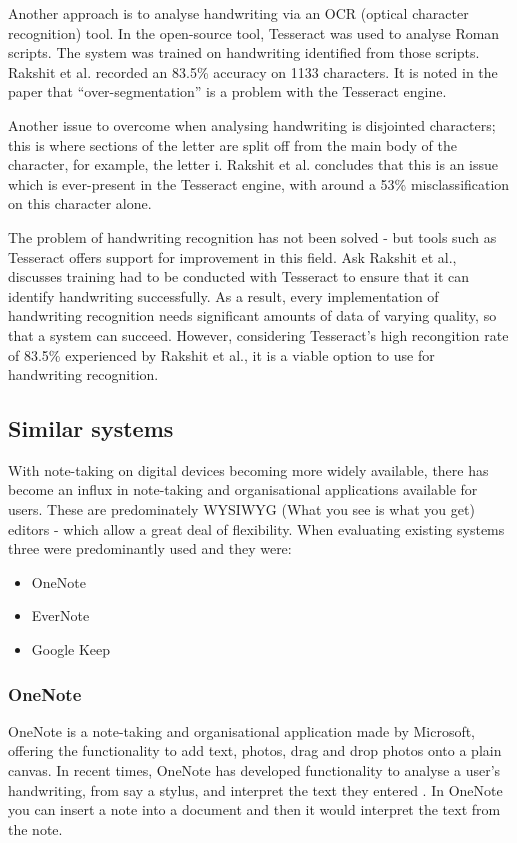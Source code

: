 Another approach is to analyse handwriting via an OCR (optical character recognition) tool. In \cite{citeulike:13920972} the open-source tool, Tesseract \cite{citeulike:14014368} was used to analyse Roman scripts. The system was trained on handwriting identified from those scripts. Rakshit et al. recorded an 83.5\% accuracy on 1133 characters. It is noted in the paper that ``over-segmentation'' is a problem with the Tesseract engine.

Another issue to overcome when analysing handwriting is disjointed characters; this is where sections of the letter are split off from the main body of the character, for example, the letter i. Rakshit et al. concludes that this is an issue which is ever-present in the Tesseract engine, with around a 53\% misclassification on this character alone.

The problem of handwriting recognition has not been solved - but tools such as Tesseract offers support for improvement in this field. Ask Rakshit et al., discusses training had to be conducted with Tesseract to ensure that it can identify handwriting successfully. As a result, every implementation of handwriting recognition needs significant amounts of data of varying quality, so that a system can succeed. However, considering Tesseract's high recongition rate of 83.5\% experienced by Rakshit et al., it is a viable option to use for handwriting recognition.

\subsection{Similar systems}
With note-taking on digital devices becoming more widely available, there has become an influx in note-taking and organisational applications available for users. These are predominately WYSIWYG (What you see is what you get) editors - which allow a great deal of flexibility. When evaluating existing systems three were predominantly used and they were:
\begin{itemize}
  \item OneNote
  \item EverNote
  \item Google Keep
\end{itemize}

\subsubsection{OneNote}
OneNote \cite{citeulike:onenote} is a note-taking and organisational application made by Microsoft, offering the functionality to add text, photos, drag and drop photos onto a plain canvas. In recent times, OneNote has developed functionality to analyse a user's handwriting, from say a stylus, and interpret the text they entered \cite{citeulike:14014236}. In OneNote you can insert a note into a document and then it would interpret the text from the note.


